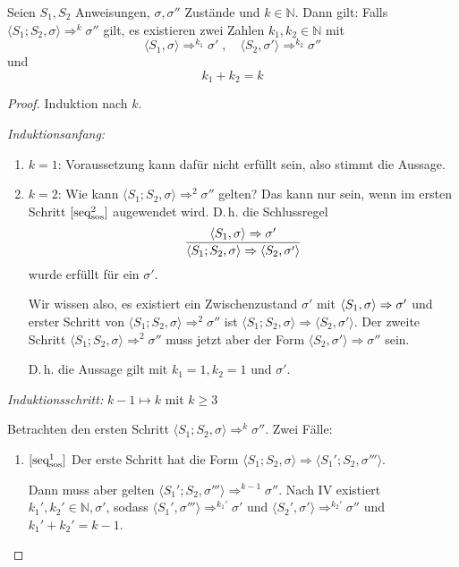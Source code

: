 \begin{lemma}
    Seien $S_1, S_2$ Anweisungen, $\sigma, \sigma''$ Zustände und $k \in \mathbb{N}$.
    Dann gilt: Falls $\langle S_1; S_2, \sigma \rangle \Rightarrow^k \sigma''$ gilt, es existieren zwei Zahlen $k_1, k_2 \in \mathbb{N}$ mit
    \[
        \langle S_1, \sigma \rangle \Rightarrow^{k_1} \sigma'
        \;,\quad
        \langle S_2, \sigma' \rangle \Rightarrow^{k_2} \sigma''
    \]
    und
    \[
        k_1 + k_2 = k
    \]
\end{lemma}
\begin{proof}
    Induktion nach $k$.

    \emph{Induktionsanfang:}
    \begin{enumerate}
        \item $k = 1$: Voraussetzung kann dafür nicht erfüllt sein, also stimmt die Aussage.
        \item $k = 2$: Wie kann $\langle S_1; S_2, \sigma \rangle \Rightarrow^2 \sigma''$ gelten?
            Das kann nur sein, wenn im ersten Schritt $\infruleSos[2]{seq}$ augewendet wird. D.\,h. die Schlussregel
            \[
                \frac{\stranssos{S_1}{\sigma}{\sigma'}}{\stranssos{S_1; S_2}{\sigma}{\langle S_2, \sigma' \rangle}}
            \]
            wurde erfüllt für ein $\sigma'$.

            Wir wissen also, es existiert ein Zwischenzustand $\sigma'$ mit $\stranssos{S_1}{\sigma}{\sigma'}$ und erster Schritt von $\langle S_1; S_2, \sigma \rangle \Rightarrow^2 \sigma''$ ist $\langle S_1; S_2, \sigma \rangle \Rightarrow \langle S_2, \sigma' \rangle$.
            Der zweite Schritt $\langle S_1; S_2, \sigma \rangle \Rightarrow^2 \sigma''$ muss jetzt aber der Form $\langle S_2, \sigma' \rangle \Rightarrow \sigma''$ sein.

            D.\,h. die Aussage gilt mit $k_1 = 1, k_2 = 1$ und $\sigma'$.
    \end{enumerate}

        \par\bigskip
    \emph{Induktionsschritt:} $k - 1 \mapsto k$ mit $k \geq 3$

    Betrachten den ersten Schritt $\langle S_1; S_2, \sigma \rangle \Rightarrow^k \sigma''$.
    Zwei Fälle:
    \begin{enumerate}
        \item $\infruleSos[1]{seq}$ Der erste Schritt hat die Form $\langle S_1; S_2, \sigma \rangle \Rightarrow \langle S_1'; S_2, \sigma''' \rangle$.

            Dann muss aber gelten $\langle S_1'; S_2, \sigma''' \rangle \Rightarrow^{k-1} \sigma''$.
            Nach IV existiert $k_1', k_2' \in \mathbb{N}, \sigma'$, sodass $\langle S_1',  \sigma''' \rangle \Rightarrow^{k_1'} \sigma'$ und $\langle S_2',  \sigma' \rangle \Rightarrow^{k_2'} \sigma''$ und $k_1' + k_2' = k - 1$.


\end{enumerate}
\end{proof}
